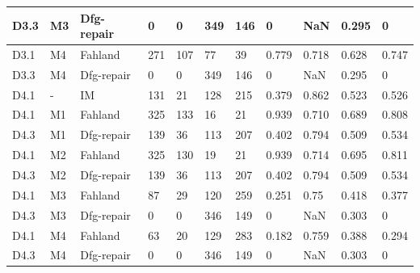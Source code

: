 \begin{table}[h]
{\begin{tabular}{lll|llllllll|}
			D3.3      & M3              & Dfg-repair       &  0   &   0 &  349   &  146   &  0      &   NaN        &  0.295        &   0      \\
			\hline
			
			D3.1      & M4              & Fahland   &  271   & 107   &  77   &  39   & 0.779       &   0.718        &   0.628       &  0.747         \\
			
			D3.3      & M4              & Dfg-repair       &  0   &  0  &   349  &  146   &   0     &      NaN     & 0.295         &    0   \\
		\hline
			D4.1      & -              & IM &  131   &  21  & 128    &  215   &    0.379    & 0.862           &   0.523       &    0.526     \\
			D4.1      & M1              & Fahland   &  325   &  133  &  16   & 21    &   0.939     &  0.710         &  0.689       & 0.808                \\
			
			D4.3      & M1              & Dfg-repair       &  139   & 36   & 113    &   207  &   0.402     &   0.794        &   0.509       &   0.534                   \\
			\hline
			D4.1      & M2              & Fahland   & 325    &  130  & 19    &  21   & 0.939       &    0.714       &  0.695        &  0.811                \\
		
			D4.3      & M2              & Dfg-repair     &  139   & 36   & 113    &   207  &   0.402     &   0.794        &   0.509       &   0.534              \\
			\hline
			D4.1      & M3              & Fahland   & 87    &  29  & 120    &  259   & 0.251       &    0.75       &  0.418        &  0.377                    \\
		
			D4.3      & M3              & Dfg-repair       &  0   &  0  & 346    &  149   &  0      &   NaN        &   0.303       &  0       \\ 
			\hline
			D4.1      & M4              & Fahland   & 63    &  20  & 129    &  283   & 0.182       &    0.759       &  0.388        &  0.294                 \\
		
			D4.3      & M4              & Dfg-repair       &   0  & 0   &  346   & 149    &   0     &    NaN       &     0.303     &  0      \\    
			 \hline              
		\end{tabular}}
	\end{table}



